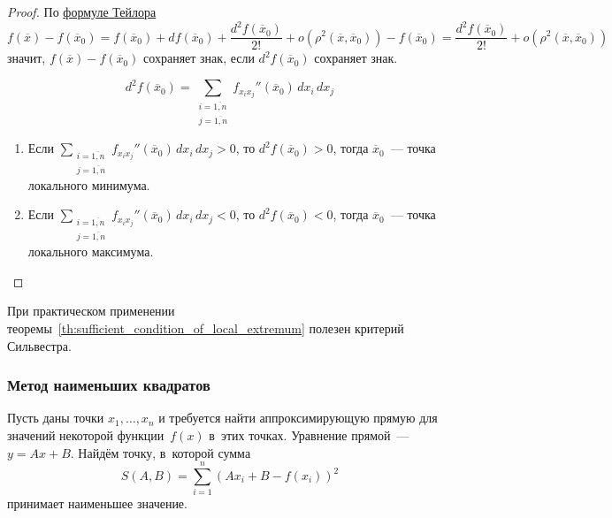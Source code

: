 \begin{proof}
По \hyperref[eq:Taylor_series_for_several_variables]{формуле Тейлора}
\begin{equation*}
f(\overline x) - f(\overline x_0) =
f(\overline x_0) + df(\overline x_0) + \frac{d^2 f(\overline x_0)}{2!} + o(\rho^2(\overline x, \overline x_0)) - f(\overline x_0) =
\frac{d^2 f(\overline x_0)}{2!} + o(\rho^2(\overline x, \overline x_0))
\end{equation*}
значит, $f(\overline x) - f(\overline x_0)$ сохраняет знак, если $d^2 f(\overline x_0)$ сохраняет знак.
	
\begin{equation*}
d^2 f(\overline x_0) = \sum_{
\begin{smallmatrix}
i = \overline{1, n} \\
j = \overline{1, n}
\end{smallmatrix}
} f_{x_i x_j}''(\overline x_0)\,dx_i\,dx_j
\end{equation*}
	
\begin{enumerate}
	\item Если $\displaystyle \sum_{
	\begin{smallmatrix}
	i = \overline{1, n} \\
	j = \overline{1, n}
	\end{smallmatrix}
	} f_{x_i x_j}''(\overline x_0)\,dx_i\,dx_j > 0$, то	$d^2 f(\overline x_0) > 0$, тогда $\overline x_0$~--- точка локального минимума.
	\item Если $\displaystyle \sum_{
	\begin{smallmatrix}
	i = \overline{1, n} \\
	j = \overline{1, n}
	\end{smallmatrix}
	} f_{x_i x_j}''(\overline x_0)\,dx_i\,dx_j < 0$, то	$d^2 f(\overline x_0) < 0$, тогда $\overline x_0$~--- точка локального максимума.
\end{enumerate}
\end{proof}
	
При практическом применении теоремы~\ref*{th:sufficient_condition_of_local_extremum} полезен критерий Сильвестра.
	
\subsubsection{Метод наименьших квадратов}
Пусть даны точки $x_1, \ldots, x_n$ и требуется найти аппроксимирующую прямую для значений некоторой функции~$f(x)$ в~этих точках.
Уравнение прямой~--- $y = Ax + B$.
Найдём точку, в~которой сумма
\begin{equation*}
S(A, B) = \sum_{i=1}^n (A x_i + B - f(x_i))^2
\end{equation*}
принимает наименьшее значение.
	
